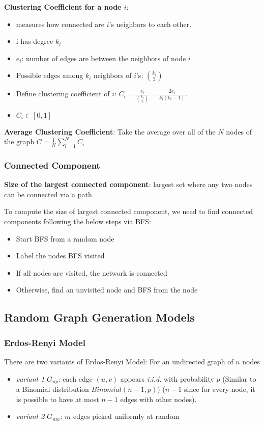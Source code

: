 \noindent \textbf{Clustering Coefficient for a node $i$}:
\begin{itemize}
    \item measures how connected are $i$'s neighbors to each other.
    \item i has degree $k_i$ 
    \item $e_i$: number of edges are between the neighbors of node $i$
    \item Possible edges among $k_i$ neighbors of $i$'s: ${k_i \choose 2}$
    \item Define clustering coefficient of $i$: $C_i =  \frac{e_i}{{k_i \choose 2} }= \frac{2e_i}{k_i(k_i -1 )}$. 
    \item $C_i \in [0,1]$
\end{itemize}

\noindent \textbf{Average Clustering Coefficient}:
Take the average over all of the $N$ nodes of the graph
$C = \frac{1}{N} \sum_{i=1}^N C_i$
\subsubsection{Connected Component}

\noindent \textbf{Size of the largest connected component}: largest set where any two nodes can be connected via a path.

\noindent To compute the size of largest connected component, we need to find connected components following the below steps via BFS:
\begin{itemize}
    \item Start BFS from a random node
    \item Label the nodes BFS visited
    \item If all nodes are visited, the network is connected
    \item Otherwise, find an unvisited node and BFS from the node
\end{itemize}

\subsection{Random Graph Generation Models}
\subsubsection{Erdos-Renyi Model}
There are two variants of Erdos-Renyi Model: For an undirected graph of $n$ nodes
\begin{itemize}
    \item  \textit{variant 1} $G_{np}$: each edge $(u,v)$ appears \textit{i.i.d.} with probability $p$ (Similar to a Binomial distribution $Binomial(n-1,p)$) ($n-1$ since for every node, it is possible to have at most $n-1$ edges with other nodes).
    \item   \textit{variant 2} $G_{nm}$: $m$ edges picked uniformly at random 
\end{itemize}

